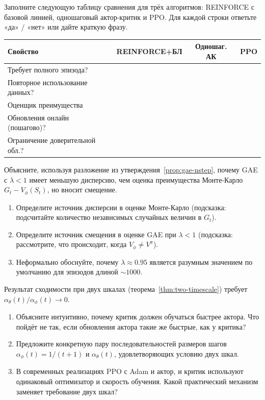 \begin{exercise}
\label{ex:ac-comparison-table}
Заполните следующую таблицу сравнения для трёх алгоритмов: REINFORCE с базовой линией, одношаговый актор-критик и PPO. Для каждой строки ответьте «да» / «нет» или дайте краткую фразу.

\begin{center}
\begin{tabular}{@{}lccc@{}}
\toprule
Свойство & REINFORCE+БЛ & Одношаг. АК & PPO \\
\midrule
Требует полного эпизода?         & & & \\
Повторное использование данных?  & & & \\
Оценщик преимущества             & & & \\
Обновления онлайн (пошагово)?    & & & \\
Ограничение доверительной обл.?  & & & \\
\bottomrule
\end{tabular}
\end{center}
\end{exercise}

\begin{exercise}
\label{ex:gae-bias-variance}
Объясните, используя разложение из утверждения~\ref{prop:gae-nstep}, почему GAE с $\lambda < 1$ имеет меньшую дисперсию, чем оценка преимущества Монте-Карло $G_t - V_\phi(S_t)$, но вносит смещение.
\begin{enumerate}[label=(\alph*)]
  \item Определите источник дисперсии в оценке Монте-Карло (подсказка: подсчитайте количество независимых случайных величин в $G_t$).
  \item Определите источник смещения в оценке GAE при $\lambda < 1$ (подсказка: рассмотрите, что происходит, когда $V_\phi \neq V^\pi$).
  \item Неформально обоснуйте, почему $\lambda \approx 0.95$ является разумным значением по умолчанию для эпизодов длиной $\sim 1000$.
\end{enumerate}
\end{exercise}

\begin{exercise}
\label{ex:two-timescale}
Результат сходимости при двух шкалах (теорема~\ref{thm:two-timescale}) требует $\alpha_\theta(t)/\alpha_\phi(t) \to 0$.
\begin{enumerate}[label=(\alph*)]
  \item Объясните интуитивно, почему критик должен обучаться быстрее актора. Что пойдёт не так, если обновления актора такие же быстрые, как у критика?
  \item Предложите конкретную пару последовательностей размеров шагов $\alpha_\phi(t) = 1/(t+1)$ и $\alpha_\theta(t)$, удовлетворяющих условию двух шкал.
  \item В современных реализациях PPO с Adam и актор, и критик используют одинаковый оптимизатор и скорость обучения. Какой практический механизм заменяет требование двух шкал?
\end{enumerate}
\end{exercise}

